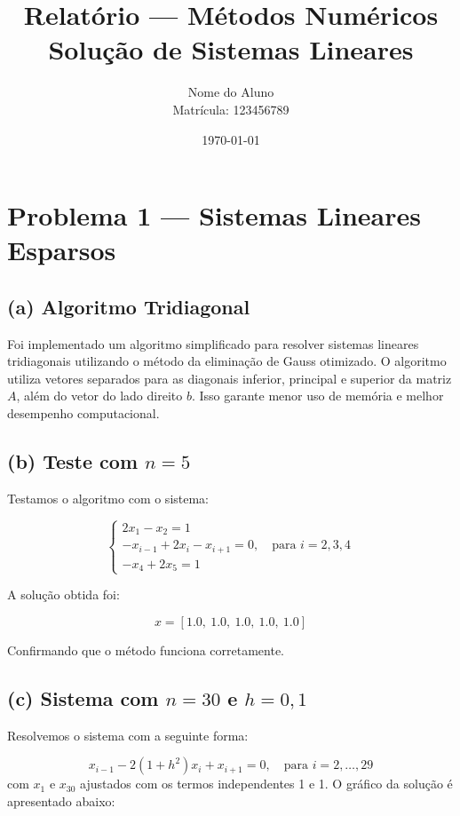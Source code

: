 \documentclass[12pt]{article}
\title{Relatório — Métodos Numéricos \\ \large Solução de Sistemas Lineares}
\author{Nome do Aluno \\ Matrícula: 123456789}
\date{\today}
\begin{document}
\maketitle

\tableofcontents
\newpage

\section*{Problema 1 — Sistemas Lineares Esparsos}

\subsection*{(a) Algoritmo Tridiagonal}

Foi implementado um algoritmo simplificado para resolver sistemas lineares tridiagonais utilizando o método da eliminação de Gauss otimizado. O algoritmo utiliza vetores separados para as diagonais inferior, principal e superior da matriz $A$, além do vetor do lado direito $b$. Isso garante menor uso de memória e melhor desempenho computacional.

\subsection*{(b) Teste com $n = 5$}

Testamos o algoritmo com o sistema:

\[
\begin{cases}
2x_1 - x_2 = 1 \\
-x_{i-1} + 2x_i - x_{i+1} = 0, \quad \text{para } i = 2, 3, 4 \\
-x_4 + 2x_5 = 1
\end{cases}
\]

A solução obtida foi:

\[
x = [1.0,\ 1.0,\ 1.0,\ 1.0,\ 1.0]
\]

Confirmando que o método funciona corretamente.

\subsection*{(c) Sistema com $n=30$ e $h=0{,}1$}

Resolvemos o sistema com a seguinte forma:

\[
x_{i-1} - 2(1 + h^2)x_i + x_{i+1} = 0, \quad \text{para } i = 2, \ldots, 29
\]
com $x_1$ e $x_{30}$ ajustados com os termos independentes 1 e 1. O gráfico da solução é apresentado abaixo:
\end{document}
